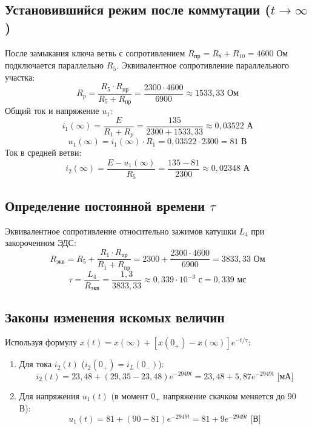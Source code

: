 \documentclass[a4paper,12pt]{article}
\begin{document}
\subsection{Установившийся режим после коммутации ($t \to \infty$)}
После замыкания ключа ветвь с сопротивлением $R_{пр} = R_8 + R_{10} = 4600$ Ом подключается параллельно $R_5$.
Эквивалентное сопротивление параллельного участка:
\begin{equation}
    R_p = \frac{R_5 \cdot R_{пр}}{R_5 + R_{пр}} = \frac{2300 \cdot 4600}{6900} \approx 1533{,}33 \text{ Ом}
\end{equation}
Общий ток и напряжение $u_1$:
\begin{equation}
    i_1(\infty) = \frac{E}{R_1 + R_p} = \frac{135}{2300 + 1533{,}33} \approx 0{,}03522 \text{ А}
\end{equation}
\begin{equation}
    u_1(\infty) = i_1(\infty) \cdot R_1 = 0{,}03522 \cdot 2300 = 81 \text{ В}
\end{equation}
Ток в средней ветви:
\begin{equation}
    i_2(\infty) = \frac{E - u_1(\infty)}{R_5} = \frac{135 - 81}{2300} \approx 0{,}02348 \text{ А}
\end{equation}

\subsection{Определение постоянной времени $\tau$}
Эквивалентное сопротивление относительно зажимов катушки $L_4$ при закороченном ЭДС:
\begin{equation}
    R_{экв} = R_5 + \frac{R_1 \cdot R_{пр}}{R_1 + R_{пр}} = 2300 + \frac{2300 \cdot 4600}{6900} = 3833{,}33 \text{ Ом}
\end{equation}
\begin{equation}
    \tau = \frac{L_4}{R_{экв}} = \frac{1{,}3}{3833{,}33} \approx 0{,}339 \cdot 10^{-3} \text{ с} = 0{,}339 \text{ мс}
\end{equation}

\subsection{Законы изменения искомых величин}
Используя формулу $x(t) = x(\infty) + [x(0_+) - x(\infty)] e^{-t/\tau}$:
\begin{enumerate}
    \item Для тока $i_2(t)$ ($i_2(0_+) = i_L(0_-)$):
    \begin{equation}
        i_2(t) = 23{,}48 + (29{,}35 - 23{,}48) e^{-2949t} = 23{,}48 + 5{,}87 e^{-2949t} \text{ [мА]}
    \end{equation}
    \item Для напряжения $u_1(t)$ (в момент $0_+$ напряжение скачком меняется до 90 В):
    \begin{equation}
        u_1(t) = 81 + (90 - 81) e^{-2949t} = 81 + 9 e^{-2949t} \text{ [В]}
    \end{equation}
\end{enumerate}
\end{document}
